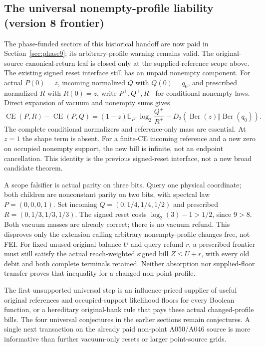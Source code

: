 \documentclass[11pt]{article}
\newcommand{\E}{\mathbb E}
\newcommand{\KL}{D_2}
\newcommand{\CE}{\operatorname{CE}}
\begin{document}
\subsection{The universal nonempty-profile liability (version 8 frontier)}
The phase-funded sectors of this historical handoff are now paid in
Section~\ref{sec:phase9}; its arbitrary-profile warning remains valid.
\label{sec:shape8}
The original-source canonical-return leaf is closed only at the
supplied-reference scope above. The existing signed reset interface
still has an unpaid nonempty component. For actual $P(0)=z$, incoming
normalized $Q$ with $Q(0)=q_0$, and prescribed normalized $R$ with
$R(0)=z$, write $P^+,Q^+,R^+$ for conditional nonempty laws. Direct
expansion of vacuum and nonempty sums gives
\[
\CE(P,R)-\CE(P,Q)
=(1-z)\E_{P^+}\log_2\frac{Q^+}{R^+}
-\KL(\operatorname{Ber}(z)\Vert\operatorname{Ber}(q_0)).
\]
The complete conditional normalizers and reference-only mass are
essential. At $z=1$ the shape term is absent. For a finite-CE incoming
reference and a new zero on occupied nonempty support, the new bill
is infinite, not an endpoint cancellation. This identity is the
previous signed-reset interface, not a new broad candidate theorem.

A scope falsifier is actual parity on three bits. Query one physical
coordinate; both children are nonconstant parity on two bits, with
spectral law $P=(0,0,0,1)$. Set incoming
$Q=(0,1/4,1/4,1/2)$ and prescribed $R=(0,1/3,1/3,1/3)$.
The signed reset costs $\log_2(3)-1>1/2$, since $9>8$.
Both vacuum masses are already correct; there is no vacuum refund.
This disproves only the extension calling arbitrary nonempty-profile
changes free, not FEI. For fixed unused original balance $U$ and
query refund $r$, a prescribed frontier must still satisfy the actual
reach-weighted signed bill $Z\le U+r$, with every old debit and both
complete terminals retained. Neither absorption nor supplied-floor
transfer proves that inequality for a changed non-point profile.

The first unsupported universal step is an influence-priced supplier
of useful original references and occupied-support likelihood floors
for every Boolean function, or a hereditary original-bank rule that
pays these actual changed-profile bills. The four universal conjectures
in the earlier sections remain conjectures. A single next transaction
on the already paid non-point A050/A046 source is more informative
than further vacuum-only resets or larger point-source grids.
\end{document}

